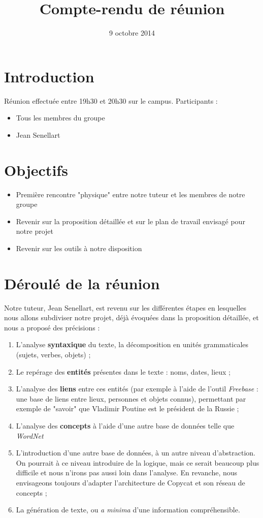 \documentclass{article}           %
\title{Compte-rendu de réunion}     %
\author{}        %
\date{9 octobre 2014}
\begin{document}
\maketitle

\section{Introduction}
Réunion effectuée entre 19h30 et 20h30 sur le campus. Participants :
\begin{itemize}
 \item Tous les membres du groupe
 \item Jean Senellart
\end{itemize}

\section{Objectifs}
\begin{itemize}
 \item Première rencontre "physique" entre notre tuteur et les membres de notre groupe
 \item Revenir sur la proposition détaillée et sur le plan de travail envisagé pour notre projet
 \item Revenir sur les outils à notre disposition
\end{itemize}

\section{Déroulé de la réunion}

Notre tuteur, Jean Senellart, est revenu sur les différentes étapes en lesquelles nous allons subdiviser notre projet, déjà évoquées dans la proposition détaillée, et nous a proposé des précisions :
\begin{enumerate}
 \item L'analyse \textbf{syntaxique} du texte, la décomposition en unités grammaticales (sujets, verbes, objets) ;
 \item Le repérage des \textbf{entités} présentes dans le texte : noms, dates, lieux ;
 \item L'analyse des \textbf{liens} entre ces entités (par exemple à l'aide de l'outil \emph{Freebase} : une base de liens entre lieux, personnes et objets connus), permettant par exemple de "savoir" que Vladimir Poutine est le président de la Russie ;
 \item L'analyse des \textbf{concepts} à l'aide d'une autre base de données telle que \emph{WordNet}
 \item L'introduction d'une autre base de données, à un autre niveau d'abstraction. On pourrait à ce niveau introduire de la logique, mais ce serait beaucoup plus difficile et nous n'irons pas aussi loin dans l'analyse. En revanche, nous envisageons toujours d'adapter l'architecture de Copycat et son réseau de concepts ;
 \item La génération de texte, ou \emph{a minima} d'une information compréhensible.
\end{enumerate}
\end{document}
